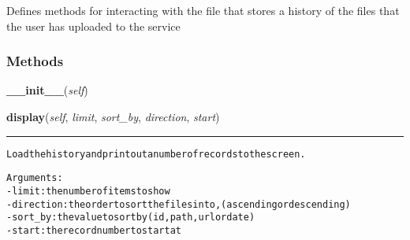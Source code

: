     \label{lib:history:History}
Defines methods for interacting with the file that stores a history of the 
files that the user has uploaded to the service



  \subsubsection{Methods}

    \label{lib:history:History:__init__}

    \vspace{0.5ex}

\hspace{.8\funcindent}\begin{boxedminipage}{\funcwidth}

    \raggedright \textbf{\_\_init\_\_}(\textit{self})

\setlength{\parskip}{2ex}
\setlength{\parskip}{1ex}
    \end{boxedminipage}

    \label{lib:history:History:display}

    \vspace{0.5ex}

\hspace{.8\funcindent}\begin{boxedminipage}{\funcwidth}

    \raggedright \textbf{display}(\textit{self}, \textit{limit}, \textit{sort\_by}, \textit{direction}, \textit{start})

    \vspace{-1.5ex}

    \rule{\textwidth}{0.5\fboxrule}
\setlength{\parskip}{2ex}
\begin{alltt}

Load the history and print out a number of records to the screen.

Arguments:
- limit: the number of items to show
- direction: the order to sort the files in to, (ascending or descending)
- sort\_by: the value to sort by (id, path, url or date)
- start: the record number to start at
\end{alltt}

\setlength{\parskip}{1ex}
    \end{boxedminipage}

